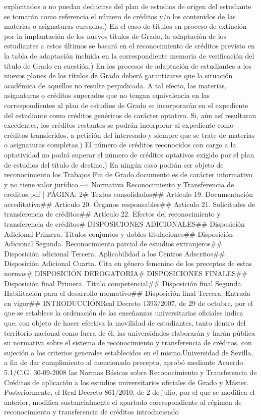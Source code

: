 \documentclass{article}
\begin{document}
\begin{itemize}
{{explicitados o no puedan deducirse del plan de estudios de origen del estudiante se tomarán como referencia el número de créditos y/o los contenidos de las materias o asignaturas cursadas.\n{}) En el caso de títulos en proceso de extinción por la implantación de los nuevos títulos de Grado, la adaptación de los estudiantes a estos últimos se basará en el reconocimiento de créditos previsto en la tabla de adaptación incluida en la correspondiente memoria de verificación del título de Grado en cuestión.\n{}) En los procesos de adaptación de estudiantes a los nuevos planes de los títulos de Grado deberá garantizarse que la situación académica de aquellos no resulte perjudicada. A tal efecto, las materias, asignaturas o créditos superados que no tengan equivalencia en las correspondientes al plan de estudios de Grado se incorporarán en el expediente del estudiante como créditos genéricos de carácter optativo. Si, aún así resultaran excedentes, los créditos restantes se podrán incorporar al expediente como créditos transferidos, a petición del interesado y siempre que se trate de materias o asignaturas completas.\n{}) El número de créditos reconocidos con cargo a la optatividad no podrá superar el número de créditos optativos exigido por el plan de estudios del título de destino.\n{}) En ningún caso podrán ser objeto de reconocimiento los Trabajos Fin de Grado.\n\nEste documento es de carácter informativo y no tiene valor jurídico.\n\n---\n\nFUENTE: Normativa Reconocimiento y Transferencia de creditos.pdf | PÁGINA: 2\n# Textos consolidados\n\n## Artículo 19. Documentación acreditativa\n\n## Artículo 20. Órganos responsables\n\n## Artículo 21. Solicitudes de transferencia de créditos\n\n## Artículo 22. Efectos del reconocimiento y transferencia de créditos\n\n# DISPOSICIONES ADICIONALES\n\n## Disposición Adicional Primera. Títulos conjuntos y dobles titulaciones\n\n## Disposición Adicional Segunda. Reconocimiento parcial de estudios extranjeros\n\n## Disposición adicional Tercera. Aplicabilidad a los Centros Adscritos\n\n## Disposición Adicional Cuarta. Cita en género femenino de los preceptos de estas normas\n\n# DISPOSICIÓN DEROGATORIA\n\n# DISPOSICIONES FINALES\n\n## Disposición ﬁnal Primera. Título competencial\n\n## Disposición ﬁnal Segunda. Habilitación para el desarrollo normativo\n\n## Disposición ﬁnal Tercera. Entrada en vigor\n\n## INTRODUCCIÓN\n\nEl Real Decreto 1393/2007, de 29 de octubre, por el que se establece la ordenación de las enseñanzas universitarias oficiales indica que, con objeto de hacer efectiva la movilidad de estudiantes, tanto dentro del territorio nacional como fuera de él, las universidades elaborarán y harán pública su normativa sobre el sistema de reconocimiento y transferencia de créditos, con sujeción a los criterios generales establecidos en el mismo.\n\nLa Universidad de Sevilla, a fin de dar cumplimiento al mencionado precepto, aprobó mediante Acuerdo 5.1/C.G. 30-09-2008 las Normas Básicas sobre Reconocimiento y Transferencia de Créditos de aplicación a los estudios universitarios oficiales de Grado y Máster. Posteriormente, el Real Decreto 861/2010, de 2 de julio, por el que se modifica el anterior, modifica sustancialmente el apartado correspondiente al régimen de reconocimiento y transferencia de créditos introduciendo }}
\end{itemize}
\end{document}

